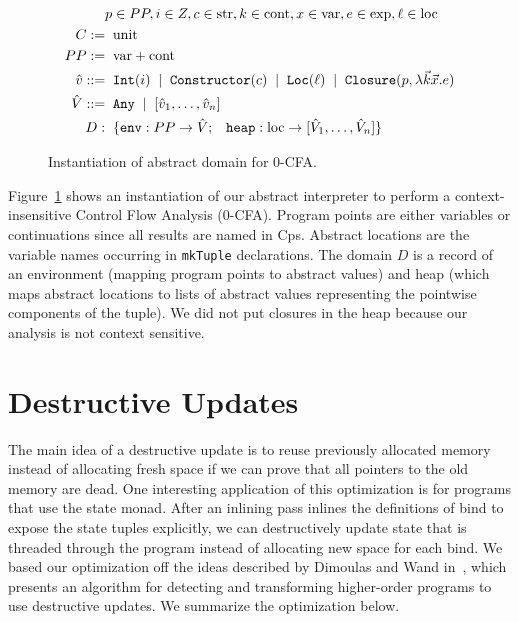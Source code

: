 \documentclass{article}
\begin{document}
\begin{figure}
\begin{align*}
& p \in PP, i \in Z, c \in \text{str}, k \in \text{cont}, x \in \text{var}, e \in \text{exp}, \ell \in \text{loc} \\
C := & \;\; \text{unit} \\
PP := & \;\; \text{var} + \text{cont} \\
\hat{v} ::= & \;\; \texttt{Int}(i) \;\; | \;\; \texttt{Constructor}(c) \;\; | \;\; \texttt{Loc}(\ell) \;\; | \;\; \texttt{Closure}(p, \lambda \vec{k} \vec{x}. e) \\
\hat{V}::= & \;\; \texttt{Any} \;\; | \;\; [\hat{v}_1, \hdots, \hat{v}_n] \\
D: & \;\; \{{\tt env}: PP \rightarrow \hat{V} ; \;\;\; {\tt heap}: \text{loc} \rightarrow [\hat{V}_1, \hdots, \hat{V}_n] \}
\end{align*}
\caption{Instantiation of abstract domain for 0-CFA.}
\label{fig:cfa0}
\end{figure}
Figure~\ref{fig:cfa0} shows an instantiation of our abstract interpreter to perform a context-insensitive Control Flow Analysis (0-CFA). Program points are either variables or continuations since all results are named in Cps. Abstract locations are the variable names occurring in {\tt mkTuple} declarations. The domain $D$ is a record of an environment (mapping program points to abstract values) and heap (which maps abstract locations to lists of abstract values representing the pointwise components of the tuple). We did not put closures in the heap because our analysis is not context sensitive.

\section{Destructive Updates}
\label{sec:destructive-updates}

The main idea of a destructive update is to reuse previously allocated memory instead of allocating fresh space if we can prove that all pointers to the old memory are dead. One interesting application of this optimization is for programs that use the state monad. After an inlining pass inlines the definitions of bind to expose the state tuples explicitly, we can destructively update state that is threaded through the program instead of allocating new space for each bind. We based our optimization off the ideas described by Dimoulas and Wand in~\cite{dimoulas2009higher}, which presents an algorithm for detecting and transforming higher-order programs to use destructive updates. We summarize the optimization below.
\end{document}
